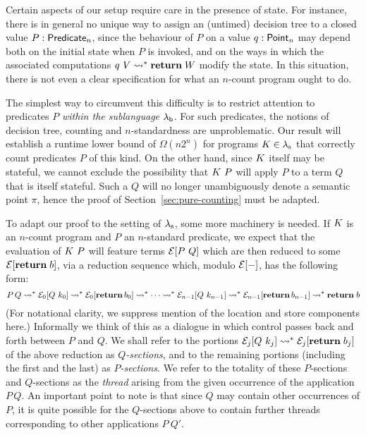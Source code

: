 \documentclass[12pt,phd,lfcs,twoside,openright,logo,leftchapter,normalheadings]{infthesis}
\theoremstyle{plain}
\theoremstyle{definition}
\begin{document}
Certain aspects of our setup require care in the presence of state.
For instance, there is in general no unique way to assign an (untimed)
decision tree to a closed value $P : \mathsf{Predicate}_n$, since the
behaviour of $P$ on a value $q : \mathsf{Point}_n$ may depend both on the
initial state when $P$ is invoked, and on the ways in which the
associated computations $q~V \leadsto^\ast \mathbf{return}\;W$ modify the
state.  In this situation, there is not even a clear specification for
what an $n$-count program ought to do.

The simplest way to circumvent this difficulty is to restrict
attention to predicates $P$ \emph{within the sublanguage $\lambda_{\mathsf{b}}$}.
For such predicates, the notions of decision tree, counting and
$n$-standardness are unproblematic. Our result will establish a
runtime lower bound of $\Omega(n2^n)$ for programs $K \in
\lambda_{\textrm{\normalfont s}}$ that correctly count predicates $P$ of this kind.
%
On the other hand, since $K$ itself may be stateful, we
cannot exclude the possibility that $K~P$ will apply $P$ to a
term $Q$ that is itself stateful. Such a $Q$ will no longer
unambiguously denote a semantic point $\pi$, hence the proof of
Section~\ref{sec:pure-counting} must be adapted.

To adapt our proof to the setting of $\lambda_{\textrm{\normalfont s}}$, some more machinery is
needed.  If $K$ is an $n$-count program and $P$ an
$n$-standard predicate, we expect that the evaluation of
$K~P$ will feature terms $\mathcal{E}[P~Q]$ which are then reduced to
some $\mathcal{E}[\mathbf{return}\;b]$, via a reduction sequence which, modulo
$\mathcal{E}[-]$, has the following form:
%
{\small
\[ P\,Q \leadsto^\ast \mathcal{E}_0[Q~k_0] \leadsto^\ast \mathcal{E}_0[\mathbf{return}\,b_0] \leadsto^\ast \cdots
   \leadsto^\ast \mathcal{E}_{n-1}[Q~k_{n-1}] \leadsto^\ast \mathcal{E}_{n-1}[\mathbf{return}\,b_{n-1}]
   \leadsto^\ast \mathbf{return}\;b
\]}%
%
(For notational clarity, we suppress mention of the location and store
components here.)  Informally we think of this as a dialogue in
which control passes back and forth between $P$ and $Q$. We shall
refer to the portions $\mathcal{E}_j[Q~k_j] \leadsto^\ast
\mathcal{E}_j[\mathbf{return}\;b_j]$ of the above reduction as \emph{$Q$-sections},
and to the remaining portions (including the first and the last) as
\emph{$P$-sections}. We refer to the totality of these $P$-sections
and $Q$-sections as the \emph{thread} arising from the given
occurrence of the application $P\,Q$.  An important point to note is
that since $Q$ may contain other occurrences of $P$, it is quite
possible for the $Q$-sections above to contain further threads
corresponding to other applications $P~Q'$.
\end{document}
